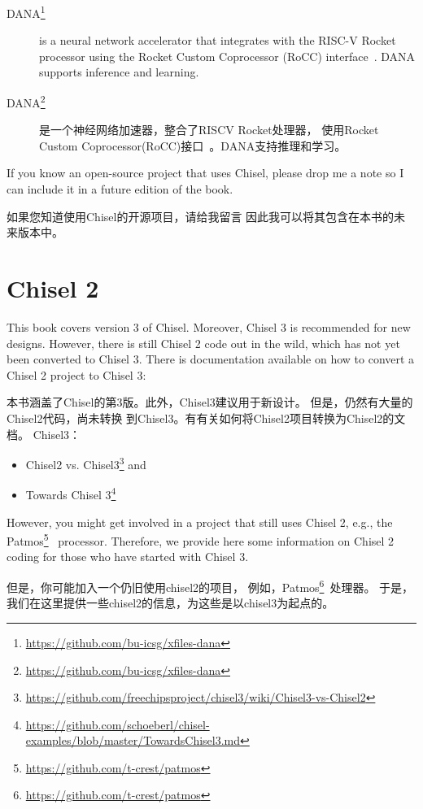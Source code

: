 \documentclass[%
    10pt,
    headinclude, footexclude,
    openright, %
    notitlepage,
    cleardoubleempty,
    headsepline,
    pointlessnumbers,
    bibtotoc, idxtotoc,
    ]{scrbook}
\newcommand{\myref}[2]{\href{#1}{#2}}
\renewcommand{\myref}[2]{{#2}{\footnote{\url{#1}}}}
\begin{document}
{\begin{description}
\item[\myref{https://github.com/bu-icsg/xfiles-dana}{DANA}] is a neural network accelerator
that integrates with the RISC-V Rocket processor using the Rocket Custom Coprocessor (RoCC) interface~\cite{RoCC:2015}.
DANA supports inference and learning.

\item[\myref{https://github.com/bu-icsg/xfiles-dana}{DANA}] 是一个神经网络加速器，整合了RISCV Rocket处理器，
使用Rocket Custom Coprocessor(RoCC)接口~\cite{RoCC:2015}。DANA支持推理和学习。

\end{description}

If you know an open-source project that uses Chisel, please drop me a note
so I can include it in a future edition of the book.


如果您知道使用Chisel的开源项目，请给我留言
因此我可以将其包含在本书的未来版本中。

\chapter{Chisel 2}

This book covers version 3 of Chisel. Moreover, Chisel 3 is recommended for new designs.
However, there is still Chisel 2 code out in the wild, which has not yet been converted
to Chisel 3. There is documentation available on how to convert a Chisel 2 project to
Chisel 3:


本书涵盖了Chisel的第3版。此外，Chisel3建议用于新设计。
但是，仍然有大量的Chisel2代码，尚未转换
到Chisel3。有有关如何将Chisel2项目转换为Chisel2的文档。
Chisel3：

\begin{itemize}
\item \myref{https://github.com/freechipsproject/chisel3/wiki/Chisel3-vs-Chisel2}{Chisel2 vs. Chisel3} and
\item \myref{https://github.com/schoeberl/chisel-examples/blob/master/TowardsChisel3.md}{Towards Chisel 3}
\end{itemize}

However, you might get involved in a project that still uses Chisel 2,
e.g., the \myref{https://github.com/t-crest/patmos}{Patmos}~\cite{patmos:rts2018} processor.
Therefore, we provide here some information on Chisel 2 coding for those who
have started with Chisel 3.

但是，你可能加入一个仍旧使用chisel2的项目，
例如，\myref{https://github.com/t-crest/patmos}{Patmos}~\cite{patmos:rts2018}处理器。
于是，我们在这里提供一些chisel2的信息，为这些是以chisel3为起点的。

}
\end{document}
